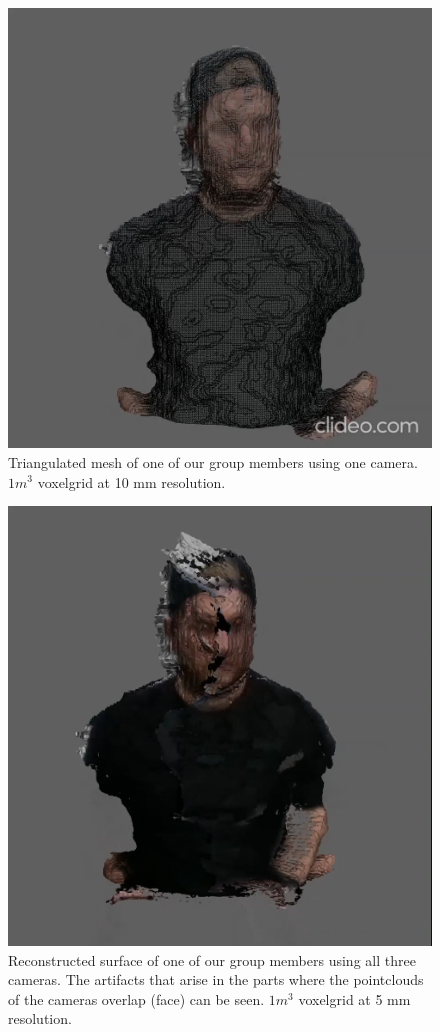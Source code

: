 \documentclass[10pt,twocolumn,letterpaper]{article}
\begin{document}
\begin{figure}[h!]
	\begin{center}
		\includegraphics[width=0.9\linewidth]{imgs/res2}
	\end{center}
	\caption{Triangulated mesh of one of our group members using one camera. $1m^3$ voxelgrid at 10 mm resolution.}
	\label{fig:wireframe}
\end{figure}

\begin{figure}[h!]
	\begin{center}
		\includegraphics[width=0.9\linewidth]{imgs/res3}
	\end{center}
	\caption{Reconstructed surface of one of our group members using all three cameras. The artifacts that arise in the parts where the pointclouds of the cameras overlap (face) can be seen. $1m^3$ voxelgrid at 5 mm resolution.}
	\label{fig:reconstruction-all-cameras}
\end{figure}
\end{document}
